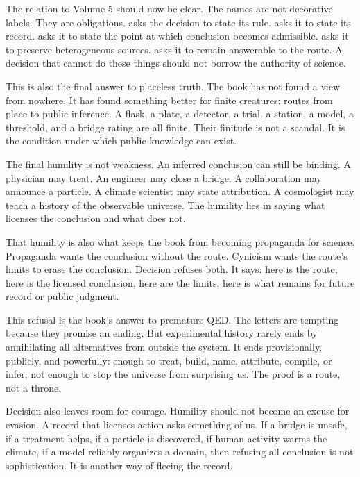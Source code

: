 \begin{movementclose}
The relation to Volume 5 should now be clear. The names are not decorative
labels. They are obligations.  asks the decision to state its
rule.  asks it to state its record.  asks it to
state the point at which conclusion becomes admissible.  asks
it to preserve heterogeneous sources.  asks it to remain
answerable to the route. A decision that cannot do these things should not
borrow the authority of science.

This is also the final answer to placeless truth. The book has not found a view
from nowhere. It has found something better for finite creatures: routes
from place to public inference. A flask, a plate, a detector, a trial, a
station, a model, a threshold, and a bridge rating are all finite. Their
finitude is not a scandal. It is the condition under which public knowledge
can exist.

The final humility is not weakness. An inferred conclusion can still be
binding. A physician may treat. An engineer may close a bridge. A
collaboration may announce a particle. A climate scientist may state
attribution. A cosmologist may teach a history of the observable universe.
The humility lies in saying what licenses the conclusion and what does not.

That humility is also what keeps the book from becoming propaganda for
science. Propaganda wants the conclusion without the route. Cynicism wants the
route's limits to erase the conclusion. Decision refuses both. It says: here
is the route, here is the licensed conclusion, here are the limits, here is
what remains for future record or public judgment.

This refusal is the book's answer to premature QED. The letters are tempting
because they promise an ending. But experimental history rarely ends by
annihilating all alternatives from outside the system. It ends provisionally,
publicly, and powerfully: enough to treat, build, name, attribute, compile,
or infer; not enough to stop the universe from surprising us. The proof is a
route, not a throne.

Decision also leaves room for courage. Humility should not become an
excuse for evasion. A record that licenses action asks something of us. If a
bridge is unsafe, if a treatment helps, if a particle is discovered, if human
activity warms the climate, if a model reliably organizes a domain, then
refusing all conclusion is not sophistication. It is another way of fleeing
the record.


\end{movementclose}
